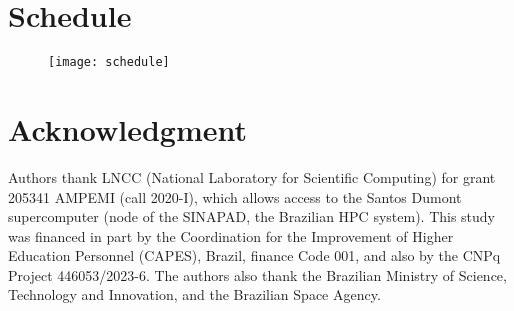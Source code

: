 \section{Schedule}


\begin{figure}[H]\centering
\texttt{[image: schedule]}
\label{fig:schedule}
\end{figure}



\section*{Acknowledgment}

Authors thank LNCC (National Laboratory for Scientific Computing) for grant 205341 AMPEMI (call 2020-I), which allows access to the Santos Dumont supercomputer (node of the SINAPAD, the Brazilian HPC system). This study was financed in part by the Coordination for the Improvement of Higher Education Personnel (CAPES), Brazil, finance Code 001, and also by the CNPq Project 446053/2023-6. The authors also thank the Brazilian Ministry of Science, Technology and Innovation, and the Brazilian Space Agency.